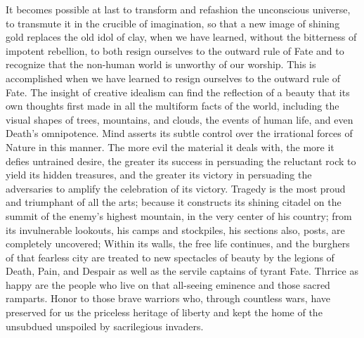 \documentclass[a4paper,12pt]{book}[2004/02/16]
\theoremstyle{ilemma}
\theoremstyle{itheorem}
\theoremstyle{iother}
\theoremstyle{icorollary}
\theoremstyle{numcorollary}
\theoremstyle{idefinition}
\begin{document}
It becomes possible at last to transform and refashion the unconscious universe, to transmute it in the crucible of imagination, so that a new image of shining gold replaces the old idol of clay, when we have learned, without the bitterness of impotent rebellion, to both resign ourselves to the outward rule of Fate and to recognize that the non-human world is unworthy of our worship. This is accomplished when we have learned to resign ourselves to the outward rule of Fate. The insight of creative idealism can find the reflection of a beauty that its own thoughts first made in all the multiform facts of the world, including the visual shapes of trees, mountains, and clouds, the events of human life, and even Death's omnipotence. Mind asserts its subtle control over the irrational forces of Nature in this manner. The more evil the material it deals with, the more it defies untrained desire, the greater its success in persuading the reluctant rock to yield its hidden treasures, and the greater its victory in persuading the adversaries to amplify the celebration of its victory. Tragedy is the most proud and triumphant of all the arts; because it constructs its shining citadel on the summit of the enemy's highest mountain, in the very center of his country;
from its invulnerable lookouts, his camps and stockpiles, his sections
also, posts, are completely uncovered; Within its walls, the free life continues, and the burghers of that fearless city are treated to new spectacles of beauty by the legions of Death, Pain, and Despair as well as the servile captains of tyrant Fate. Thrrice as happy are the people who live on that all-seeing eminence and those sacred ramparts. Honor to those brave warriors who, through countless wars, have preserved for us the priceless heritage of liberty and kept the home of the unsubdued unspoiled by sacrilegious invaders.
\end{document}
